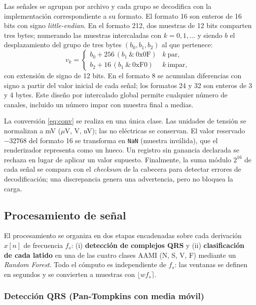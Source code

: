 Las señales se agrupan por archivo y cada grupo se decodifica con la implementación correspondiente a su formato. El formato 16 son enteros de 16 bits con signo \emph{little-endian}. En el formato 212, dos muestras de 12 bits comparten tres bytes; numerando las muestras intercaladas con $k=0,1,\dots$ y siendo $b$ el desplazamiento del grupo de tres bytes $(b_0,b_1,b_2)$ al que pertenece:
\begin{equation}
v_k=\begin{cases}
b_0+256\,(b_1\ \&\ \mathrm{0x0F}) & k\ \text{par},\\
b_2+16\,(b_1\ \&\ \mathrm{0xF0}) & k\ \text{impar},
\end{cases}
\end{equation}
con extensión de signo de 12 bits. En el formato 8 se acumulan diferencias con signo a partir del valor inicial de cada señal; los formatos 24 y 32 son enteros de 3 y 4 bytes. Este diseño por intercalado global permite cualquier número de canales, incluido un número impar con muestra final a medias.

La conversión \eqref{eq:conv} se realiza en una única clase. Las unidades de tensión se normalizan a mV ($\mu$V, V, nV); las no eléctricas se conservan. El valor reservado $-32768$ del formato 16 se transforma en \texttt{NaN} (muestra inválida), que el renderizador representa como un hueco. Un registro sin ganancia declarada se rechaza en lugar de aplicar un valor supuesto. Finalmente, la suma módulo $2^{16}$ de cada señal se compara con el \emph{checksum} de la cabecera para detectar errores de decodificación; una discrepancia genera una advertencia, pero no bloquea la carga.


\subsection{Procesamiento de señal}

El procesamiento se organiza en dos etapas encadenadas sobre cada derivación $x[n]$ de frecuencia $f_s$: (i) \textbf{detección de complejos QRS} y (ii) \textbf{clasificación de cada latido} en una de las cuatro clases AAMI (N, S, V, F) mediante un \emph{Random Forest}. Todo el cómputo es independiente de $f_s$: las ventanas se definen en segundos y se convierten a muestras con $\lfloor w f_s \rceil$.

\subsubsection{Detección QRS (Pan-Tompkins con media móvil)}

